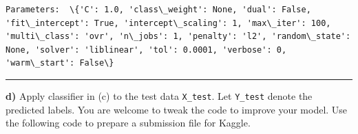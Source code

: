 \documentclass[11pt]{article}
\begin{document}
    \begin{Verbatim}[commandchars=\\\{\}]
Parameters:  \{'C': 1.0, 'class\_weight': None, 'dual': False, 'fit\_intercept': True, 'intercept\_scaling': 1, 'max\_iter': 100, 'multi\_class': 'ovr', 'n\_jobs': 1, 'penalty': 'l2', 'random\_state': None, 'solver': 'liblinear', 'tol': 0.0001, 'verbose': 0, 'warm\_start': False\}

    \end{Verbatim}

    \begin{center}\rule{0.5\linewidth}{\linethickness}\end{center}

\textbf{d)} Apply classifier in (c) to the test data \texttt{X\_test}.
Let \texttt{Y\_test} denote the predicted labels. You are welcome to
tweak the code to improve your model. Use the following code to prepare
a submission file for Kaggle.
\end{document}

